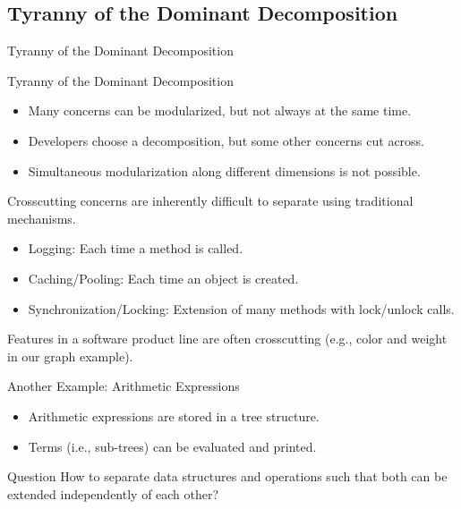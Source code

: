 \subsection{Tyranny of the Dominant Decomposition}

\begin{frame}{Tyranny of the Dominant Decomposition}
	\begin{mycolumns}[widths={50,50},animation=none]
		\begin{definition}{Tyranny of the Dominant Decomposition}
			\begin{itemize}
				\item Many concerns can be modularized, but not always at the same time.
				\item Developers choose a decomposition, but some other concerns cut across.
				\item Simultaneous modularization along different dimensions is not possible.
			\end{itemize}
		\end{definition}
	\mynextcolumn
		\begin{note}{}
			Crosscutting concerns are inherently difficult to separate using traditional mechanisms.
			\begin{itemize}
				\item Logging: Each time a method is called.
				\item Caching/Pooling: Each time an object is created.
				\item Synchronization/Locking: Extension of many methods with lock/unlock calls.
			\end{itemize}
			Features in a software product line are often crosscutting (e.g., color and weight in our graph example).
		\end{note}
	\end{mycolumns}
\end{frame}

\begin{frame}{Another Example: Arithmetic Expressions}
	\begin{mycolumns}[widths={50,50},animation=none]
		\begin{example}{}
			\begin{itemize}
				\item Arithmetic expressions are stored in a tree structure.
				\item Terms (i.e., sub-trees) can be evaluated and printed.
			\end{itemize}
		\end{example}
		\begin{note}{Question}
			How to separate data structures and operations such that both can be extended independently of each other?
		\end{note}
	\mynextcolumn
		\begin{exampletight}{}
			\centering
		\end{exampletight}
	\end{mycolumns}
\end{frame}

